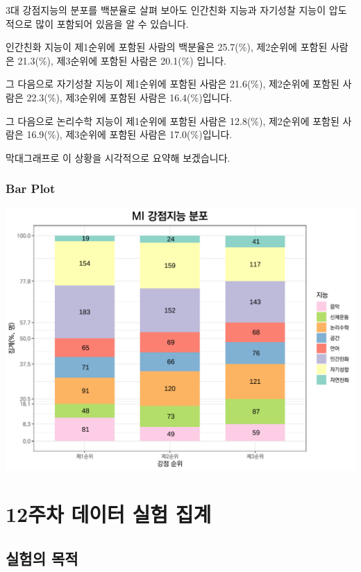 \documentclass[
]{book}
\begin{document}
3대 강점지능의 분포를 백분율로 살펴 보아도 인간친화 지능과 자기성찰 지능이 압도적으로 많이 포함되어 있음을 알 수 있습니다.

인간친화 지능이 제1순위에 포함된 사람의 백분율은 25.7(\%), 제2순위에 포함된 사람은 21.3(\%), 제3순위에 포함된 사람은 20.1(\%) 입니다.

그 다음으로
자기성찰 지능이 제1순위에 포함된 사람은 21.6(\%), 제2순위에 포함된 사람은 22.3(\%), 제3순위에 포함된 사람은 16.4(\%)입니다.

그 다음으로 논리수학 지능이 제1순위에 포함된 사람은 12.8(\%), 제2순위에 포함된 사람은 16.9(\%), 제3순위에 포함된 사람은 17.0(\%)입니다.

막대그래프로 이 상황을 시각적으로 요약해 보겠습니다.

\subsection{Bar Plot}\label{bar-plot}

\includegraphics{Quiz_report_2025_files/figure-latex/unnamed-chunk-360-1.pdf}

\chapter{12주차 데이터 실험 집계}\label{uxc8fcuxcc28-uxb370uxc774uxd130-uxc2e4uxd5d8-uxc9d1uxacc4-10}

\section{실험의 목적}\label{uxc2e4uxd5d8uxc758-uxbaa9uxc801-13}
\end{document}
